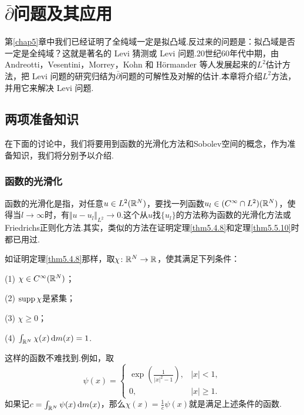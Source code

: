 \chapter{$\bar{\partial}$问题及其应用\label{chap6}}
第\ref{chap5}章中我们已经证明了全纯域一定是拟凸域.反过来的问题是：拟凸域是否一定是全纯域？这就是著名的 Levi 猜测或 Levi 问题.20世纪60年代中期，由 Andreotti，Vesentini，Morrey，Kohn 和 H\"ormander 等人发展起来的$L^2$估计方法，把 Levi 问题的研究归结为$\bar{\partial}$问题的可解性及对解的估计.本章将介绍$L^2$方法，并用它来解决 Levi 问题.
\section{两项准备知识\label{sec6.1}}
在下面的讨论中，我们将要用到函数的光滑化方法和Sobolev空间的概念，作为准备知识，我们将分别予以介绍.
\subsection{函数的光滑化}
函数的光滑化是指，对任意$u\in L^2(\mathbb R^N)$，要找一列函数$u_l\in(C^\infty\cap L^2)(\mathbb R^N)$，使得当$l\to\infty$时，有$\Vert u-u_l\Vert_{L^2}\to0$.这个从$u$找$\{u_l\}$的方法称为函数的光滑化方法或Friedrichs正则化方法.其实，类似的方法在证明定理\ref{thm5.4.8}和定理\ref{thm5.5.10}时都已用过.

如证明定理\ref{thm5.4.8}那样，取$\chi\colon \mathbb R^N\to\mathbb R$，使其满足下列条件：

(1) $\chi\in C^\infty(\mathbb R^N)$；

(2) $\operatorname{supp}\chi$是紧集；

(3) $\chi\ge0$；

(4) $\int_{\mathbb R^N}\chi(x)\mathop{}\!\mathrm{d} m(x)=1$.

这样的函数不难找到.例如，取
\[\psi(x)=\begin{cases}
	\exp\left(\frac1{|x|^2-1}\right),&|x|<1,\\
	0,&|x|\ge1.
\end{cases}\]
如果记$c=\int_{\mathbb R^N}\psi(x)\mathop{}\!\mathrm{d} m(x)$，那么$\chi(x)=\frac1c \psi(x)$就是满足上述条件的函数.

